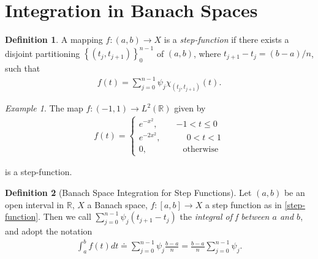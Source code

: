\documentclass[12pt,reqno]{amsart}
\numberwithin{equation}{section}  %
\numberwithin{figure}{section}
\newcommand{\rr}{\mathbb{R}}
\theoremstyle{plain}
\theoremstyle{definition}
\newtheorem{definition}{Definition}
\theoremstyle{remark}
\newtheorem{example}{Example}
\begin{document}
\section{Integration in Banach Spaces}
%
%
%
%
%
%
%
%
%
%
%
%
%
%
%
%
\begin{definition}
	A mapping $f:(a,b) \to X$ is a \emph{step-function} if there exists a disjoint
	partitioning $\left\{ (t_{j}, t_{j+1}) \right\}_{0}^{n-1}$ of $(a,b)$,
	where $ t_{j +1} - t_{j} = (b-a)/n$, such that
	\begin{equation}
		\label{step-function}
		\begin{split}
			f(t)=\sum_{j=0}^{n-1} {\psi_j} \chi_{(t_{j}, t_{j+1})}(t).
		\end{split}
	\end{equation}
\end{definition}
%
%
\begin{example}
	The map $f:(-1,1) \to L^2(\rr)$ given by 
	\begin{equation*}
		\begin{split}
			f(t) = 
			\begin{cases}
				 e^{-x^2},  \quad & -1<t\le0 \\
				 e^{-2x^2},  \quad & \phantom - 0 <t<1 \\
				 0,  \quad & \phantom - \text{otherwise}
			\end{cases}
		\end{split}
	\end{equation*}
	\end{example}
	is a step-function.
%
%
\begin{definition}[Banach Space Integration for Step Functions]
	Let $(a,b)$ be an open interval in $\rr$, $X$ a Banach space, $f: [a,b] \to
	X$ a step function as in \eqref{step-function}. 
	Then we call $\sum_{j=0}^{n-1} \psi_j (t_{j +1} - t_{j})$ the \emph{integral of f between $a$ and $b$}, and
	adopt the notation
	\begin{equation*}
		\begin{split}
			\int_a^b f(t) dt \doteq \sum_{j=0}^{n-1} \psi_j \frac{b-a}{n} =
			\frac{b-a}{n} \sum_{j=0}^{n-1} \psi_j. 
		\end{split}
	\end{equation*}
%
\end{definition}
\end{document}
